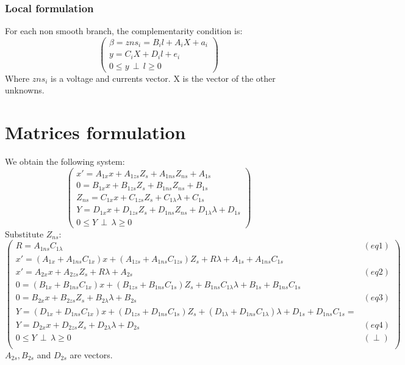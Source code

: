 \subsubsection{Local formulation}
For each non smooth branch, the complementarity condition is:\\
\[\left(\begin{array}{c}
\beta = zns_{i} = B_{i}l+A_{i}X + a_{i}\\
y=C_{i}X+D_{i}l+e_{i}\\
0 \leq y \, \perp \, l \geq 0
\end{array}\right)\]
Where $zns_{i}$ is a voltage and currents vector. X is the vector of the other unknowns.


\section{Matrices formulation}



We obtain the following system:
\[\left(\begin{array}{c}
x'=A_{1x}x +A_{1zs}Z_{s} + A_{1ns}Z_{ns}+A_{1s}\\
0=B_{1x}x+B_{1zs}Z_{s} + B_{1ns}Z_{ns}+B_{1s}\\
Z_{ns}= C_{1x}x+C_{1zs}Z_{s}+C_{1\lambda}\lambda +C_{1s}\\
Y=D_{1x}x +D_{1zs}Z_{s}+D_{1ns}Z_{ns}+D_{1\lambda}\lambda+D_{1s}\\
0 \leq Y \, \perp \, \lambda \geq 0
\end{array}\right)\]
Substitute $Z_{ns}$:
\[\left(\begin{array}{cc}
R=A_{1ns}C_{1\lambda}&(eq1)\\
x'=(A_{1x}+A_{1ns}C_{1x})x +(A_{1zs}+A_{1ns}C_{1zs})Z_{s} +R\lambda+A_{1s} + A_{1ns}C_{1s}\\
x'=A_{2x}x +A_{2zs}Z_{s} +R \lambda +A_{2s}&(eq2)\\
0=(B_{1x}+B_{1ns}C_{1x})x+(B_{1zs}+B_{1ns}C_{1s})Z_{s} + B_{1ns}C_{1\lambda}\lambda +B_{1s} + B_{1ns}C_{1s} \\
0=B_{2x}x+B_{2zs}Z_{s} + B_{2\lambda}\lambda + B_{2s}&(eq3)\\
Y=(D_{1x}+D_{1ns}C_{1x})x+(D_{1zs}+D_{1ns}C_{1s})Z_{s}+(D_{1\lambda}+D_{1ns}C_{1\lambda})\lambda +D_{1s}+D_{1ns}C_{1s}=\\
Y=D_{2x}x+D_{2zs}Z_{s}+D_{2\lambda}\lambda + D_{2s} &(eq4)\\
0 \leq Y \, \perp \, \lambda \geq 0&(\perp)\\
\end{array}\right)\]
$A_{2s}, B_{2s}$ and $D_{2s}$ are vectors.
\newpage

